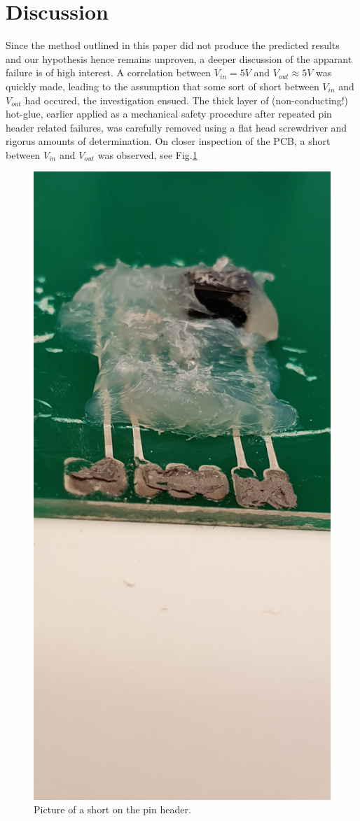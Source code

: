 \section{Discussion}
Since the method outlined in this paper did not produce the predicted results and our hypothesis hence remains unproven, a deeper discussion of the apparant failure is of high interest. A correlation between $V_{in} = 5V$ and $V_{out} \approx 5V$ was quickly made, leading to the assumption that some sort of short between $V_{in}$ and $V_{out}$ had occured, the investigation ensued. The thick layer of (non-conducting!) hot-glue, earlier applied as a mechanical safety procedure after repeated pin header related failures, was carefully removed using a flat head screwdriver and rigorus amounts of determination. On closer inspection of the PCB, a short between $V_{in}$ and $V_{out}$ was observed, see Fig.\ref{fig:short}

\begin{figure}
    \includegraphics[width=\linewidth]{ela302-kortslutning.jpg}
    \caption{Picture of a short on the pin header.}
    \label{fig:short}
\end{figure}
